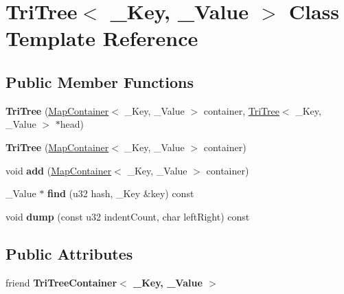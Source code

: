 \hypertarget{class_tri_tree}{}\section{Tri\+Tree$<$ \+\_\+\+Key, \+\_\+\+Value $>$ Class Template Reference}
\label{class_tri_tree}
\subsection*{Public Member Functions}
\begin{DoxyCompactItemize}
\item 
\mbox{\label{class_tri_tree_a70f1ea56b8f3843080efeee51448efda}} 
{\bfseries Tri\+Tree} (\mbox{\hyperlink{struct_map_container}{Map\+Container}}$<$ \+\_\+\+Key, \+\_\+\+Value $>$ container, \mbox{\hyperlink{class_tri_tree}{Tri\+Tree}}$<$ \+\_\+\+Key, \+\_\+\+Value $>$ $\ast$head)
\item 
\mbox{\label{class_tri_tree_a1486be4a3f31195cb91ece9068ca7be1}} 
{\bfseries Tri\+Tree} (\mbox{\hyperlink{struct_map_container}{Map\+Container}}$<$ \+\_\+\+Key, \+\_\+\+Value $>$ container)
\item 
\mbox{\label{class_tri_tree_aa15de6392aea8ea8a3375b31ccae2c1e}} 
void {\bfseries add} (\mbox{\hyperlink{struct_map_container}{Map\+Container}}$<$ \+\_\+\+Key, \+\_\+\+Value $>$ container)
\item 
\mbox{\label{class_tri_tree_a6ab6bfbee512c4e718eff864e080268b}} 
\+\_\+\+Value $\ast$ {\bfseries find} (u32 hash, \+\_\+\+Key \&key) const
\item 
\mbox{\label{class_tri_tree_a06651c4cddb99f98706d0f6a010bf618}} 
void {\bfseries dump} (const u32 indent\+Count, char left\+Right) const
\end{DoxyCompactItemize}
\subsection*{Public Attributes}
\begin{DoxyCompactItemize}
\item 
\mbox{\label{class_tri_tree_a90ff0ac9397345b6d6c27396f97a057b}} 
friend {\bfseries Tri\+Tree\+Container$<$ \+\_\+\+Key, \+\_\+\+Value $>$}
\end{DoxyCompactItemize}
